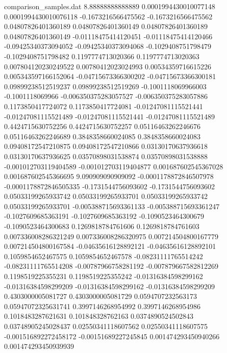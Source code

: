\begin{filecontents}{comparison_samples.dat}
8.88888888888889    0.0001994430010077148   0.0001994430010076118   -0.1673216566475562    -0.1673216566475562    0.04807826401360189    0.04807826401360149    0.04807826401360189    0.04807826401360149    -0.01118475414120451   -0.01118475414120466   -0.09425340373094052    -0.09425340373094068    -0.1029408751798479    -0.1029408751798482    0.1197774713020366      0.1197774713020363      0.007804120230249522    0.00780412023024993     0.00534359716615226     0.005343597166152064    -0.04715673366300202    -0.04715673366300181    0.09899238512519237     0.09899238512519269     -0.1001118069966003     -0.1001118069966        -0.006350375283057527  -0.006350375283057886  0.1173850417724072     0.1173850417724081     -0.01247081115521441    -0.01247081115521489    -0.01247081115521441    -0.01247081115521489    0.4424715630752256     0.4424715630752257     0.05116463262246676     0.05116463262246689     0.3848358660024085     0.3848358660024083     0.09408172547210875     0.09408172547210866     0.03130170637936618     0.03130170637936625     0.03570898031538874    0.03570898031538888    -0.001012703119404589  -0.001012703119404877  0.001687602545367028    0.001687602545366695  
9.090909090909092   -0.0001178872846507978  -0.0001178872846505335  -0.1731544756093602    -0.1731544756093602    0.05033199265933742    0.05033199265933701    0.05033199265933742    0.05033199265933701    -0.005388715693361133  -0.005388715693361247  -0.1027609685363191     -0.1027609685363192     -0.1090523464300679    -0.1090523464300683    0.1269818784761606      0.1269818784761603      0.007336008286321249    0.007336008286320975    0.007214504800167779    0.007214504800167584    -0.04635616128892121    -0.04635616128892101    0.1059854652467575      0.1059854652467578      -0.08231111765514242    -0.08231111765514208    -0.00787966758281192   -0.007879667582812269  0.1198519225355231     0.1198519225355242     -0.01316384598299162    -0.01316384598299209    -0.01316384598299162    -0.01316384598299209    0.4303000005081727     0.4303000005081729     0.0594707232563173      0.05947072325631741     0.3997146268954992     0.3997146268954986     0.1018483287621631      0.101848328762163       0.0374890524502843      0.03748905245028437     0.02550341118607562    0.02550341118607575    -0.001516892272458172  -0.00151689227245845   0.001474293450940266    0.001474293450939939  

\end{filecontents}
